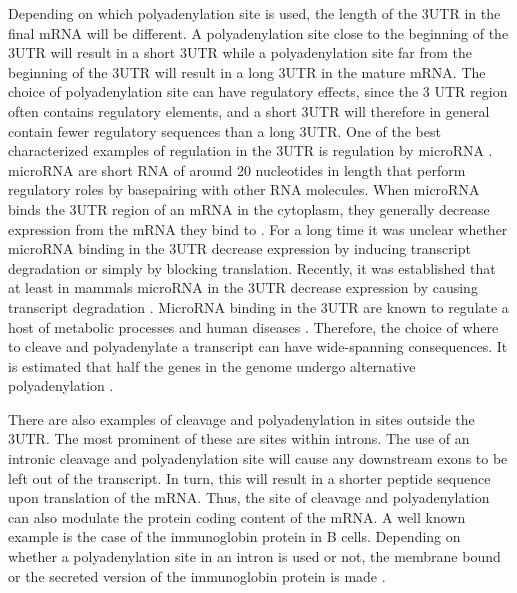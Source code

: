 Depending on which polyadenylation site is used, the length of the 3\ppp UTR in the
final mRNA will be different. A polyadenylation site close to the beginning of the
3\ppp UTR will result in a short 3\ppp UTR while a polyadenylation site far from the
beginning of the 3\ppp UTR will result in a long 3\ppp UTR in the mature mRNA.
The choice of polyadenylation site can have regulatory effects, since the 3\ppp
UTR region often contains regulatory elements, and a short 3\ppp UTR will
therefore in general contain fewer regulatory sequences than a long 3\ppp UTR.
One of the best characterized examples of regulation in the 3\ppp UTR is
regulation by microRNA \cite{digiammartino_mechanisms_2011}. microRNA are short
RNA of around 20 nucleotides in length that perform regulatory roles by
basepairing with other RNA molecules. When microRNA binds the 3\ppp UTR region
of an mRNA in the cytoplasm, they generally decrease expression from the mRNA
they bind to \cite{bartel_micrornas:_2004}. For a long time it was unclear
whether microRNA binding in the 3\ppp UTR decrease expression by inducing
transcript degradation or simply by blocking translation. Recently, it was
established that at least in mammals microRNA in the 3\ppp UTR decrease
expression by causing transcript degradation \cite{huntzinger_gene_2011}.
MicroRNA binding in the 3\ppp UTR are known to regulate a host of metabolic
processes and human diseases \cite{huang_biological_2010}. Therefore,
the choice of where to cleave and polyadenylate a transcript can have
wide-spanning consequences. It is estimated that half the genes in the genome
undergo alternative polyadenylation \cite{tian_large-scale_2005}.

There are also examples of cleavage and polyadenylation in sites outside the
3\ppp UTR. The most prominent of these are sites within introns. The use of an
intronic cleavage and polyadenylation site will cause any downstream exons to be left
out of the transcript. In turn, this will result in a shorter peptide sequence
upon translation of the mRNA. Thus, the site of cleavage and polyadenylation
can also modulate the protein coding content of the mRNA. A well known example
is the case of the immunoglobin protein in B cells. Depending on whether a
polyadenylation site in an intron is used or not, the membrane bound or the secreted
version of the immunoglobin protein is made \cite{peterson_regulated_1989}.

